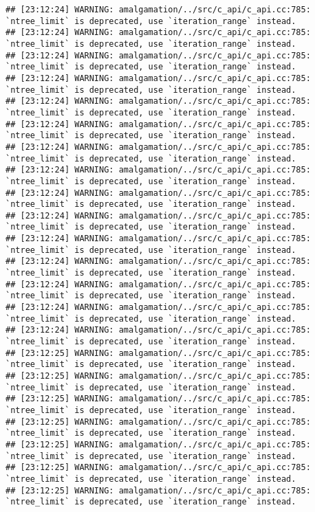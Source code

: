 \documentclass[
]{article}
\begin{document}
\begin{verbatim}
## [23:12:24] WARNING: amalgamation/../src/c_api/c_api.cc:785: `ntree_limit` is deprecated, use `iteration_range` instead.
## [23:12:24] WARNING: amalgamation/../src/c_api/c_api.cc:785: `ntree_limit` is deprecated, use `iteration_range` instead.
## [23:12:24] WARNING: amalgamation/../src/c_api/c_api.cc:785: `ntree_limit` is deprecated, use `iteration_range` instead.
## [23:12:24] WARNING: amalgamation/../src/c_api/c_api.cc:785: `ntree_limit` is deprecated, use `iteration_range` instead.
## [23:12:24] WARNING: amalgamation/../src/c_api/c_api.cc:785: `ntree_limit` is deprecated, use `iteration_range` instead.
## [23:12:24] WARNING: amalgamation/../src/c_api/c_api.cc:785: `ntree_limit` is deprecated, use `iteration_range` instead.
## [23:12:24] WARNING: amalgamation/../src/c_api/c_api.cc:785: `ntree_limit` is deprecated, use `iteration_range` instead.
## [23:12:24] WARNING: amalgamation/../src/c_api/c_api.cc:785: `ntree_limit` is deprecated, use `iteration_range` instead.
## [23:12:24] WARNING: amalgamation/../src/c_api/c_api.cc:785: `ntree_limit` is deprecated, use `iteration_range` instead.
## [23:12:24] WARNING: amalgamation/../src/c_api/c_api.cc:785: `ntree_limit` is deprecated, use `iteration_range` instead.
## [23:12:24] WARNING: amalgamation/../src/c_api/c_api.cc:785: `ntree_limit` is deprecated, use `iteration_range` instead.
## [23:12:24] WARNING: amalgamation/../src/c_api/c_api.cc:785: `ntree_limit` is deprecated, use `iteration_range` instead.
## [23:12:24] WARNING: amalgamation/../src/c_api/c_api.cc:785: `ntree_limit` is deprecated, use `iteration_range` instead.
## [23:12:24] WARNING: amalgamation/../src/c_api/c_api.cc:785: `ntree_limit` is deprecated, use `iteration_range` instead.
## [23:12:24] WARNING: amalgamation/../src/c_api/c_api.cc:785: `ntree_limit` is deprecated, use `iteration_range` instead.
## [23:12:25] WARNING: amalgamation/../src/c_api/c_api.cc:785: `ntree_limit` is deprecated, use `iteration_range` instead.
## [23:12:25] WARNING: amalgamation/../src/c_api/c_api.cc:785: `ntree_limit` is deprecated, use `iteration_range` instead.
## [23:12:25] WARNING: amalgamation/../src/c_api/c_api.cc:785: `ntree_limit` is deprecated, use `iteration_range` instead.
## [23:12:25] WARNING: amalgamation/../src/c_api/c_api.cc:785: `ntree_limit` is deprecated, use `iteration_range` instead.
## [23:12:25] WARNING: amalgamation/../src/c_api/c_api.cc:785: `ntree_limit` is deprecated, use `iteration_range` instead.
## [23:12:25] WARNING: amalgamation/../src/c_api/c_api.cc:785: `ntree_limit` is deprecated, use `iteration_range` instead.
## [23:12:25] WARNING: amalgamation/../src/c_api/c_api.cc:785: `ntree_limit` is deprecated, use `iteration_range` instead.

\end{verbatim}
\end{document}
